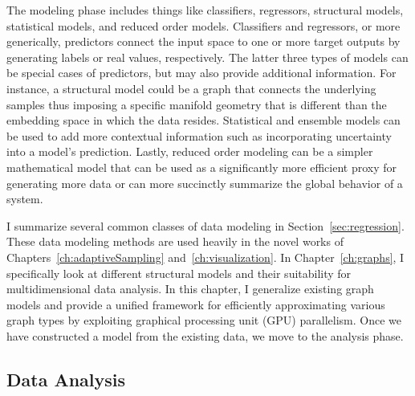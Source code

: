 The modeling phase includes things like classifiers, regressors, structural models, statistical models, and reduced order models.
%
Classifiers and regressors, or more generically, predictors connect the input space to one or more target outputs by generating labels or real values, respectively.
%
The latter three types of models can be special cases of predictors, but may also provide additional information.
%
For instance, a structural model could be a graph that connects the underlying samples thus imposing a specific manifold geometry that is different than the embedding space in which the data resides.
%
Statistical and ensemble models can be used to add more contextual information such as incorporating uncertainty into a model's prediction.
%
Lastly, reduced order modeling can be a simpler mathematical model that can be used as a significantly more efficient proxy for generating more data or can more succinctly summarize the global behavior of a system.

I summarize several common classes of data modeling in Section~\ref{sec:regression}.
%
These data modeling methods are used heavily in the novel works of Chapters~\ref{ch:adaptiveSampling} and~\ref{ch:visualization}.
%
In Chapter~\ref{ch:graphs}, I specifically look at different structural models and their suitability for multidimensional data analysis.
%
In this chapter, I generalize existing graph models and provide a unified framework for efficiently approximating various graph types by exploiting graphical processing unit (GPU) parallelism.
%
Once we have constructed a model from the existing data, we move to the analysis phase.

\subsection{Data Analysis}

